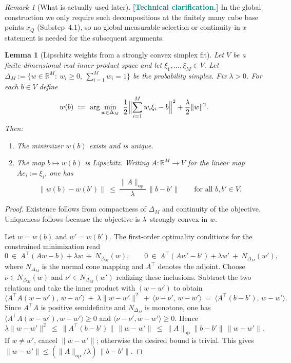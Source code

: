 \documentclass[11pt]{article}
\newcommand{\REVMZ}[1]{\textcolor{teal}{#1}}  %
\numberwithin{equation}{section}  %
\theoremstyle{plain}
\newtheorem{lemma}[theorem]{Lemma}
\theoremstyle{definition}
\theoremstyle{remark}
\newtheorem{remark}[theorem]{Remark}
\newcommand{\R}{\mathbb{R}}
\begin{document}
\begin{remark}[What is actually used later]\label{rem:caratheodory-quantitative}
\REVMZ{\textbf{[Technical clarification.]}}
In the global construction we only require such decompositions at the finitely many cube base points $x_Q$
(Substep~4.1), so no global measurable selection or continuity-in-$x$ statement is needed for the subsequent arguments.




\end{remark}

\begin{lemma}[Lipschitz weights from a strongly convex simplex fit]\label{lem:lipschitz-qp-weights}
Let $V$ be a finite-dimensional real inner-product space and let $\xi_1,\dots,\xi_M\in V$.
Let $\Delta_M:=\{w\in\R^M:\ w_i\ge 0,\ \sum_{i=1}^M w_i=1\}$ be the probability simplex.
Fix $\lambda>0$.
For each $b\in V$ define
\[
w(b)\ :=\ \arg\min_{w\in\Delta_M}\ \frac12\Bigl\|\sum_{i=1}^M w_i\xi_i-b\Bigr\|^2+\frac{\lambda}{2}\|w\|^2.
\]
Then:
\begin{enumerate}
\item[\textnormal{(i)}] The minimizer $w(b)$ exists and is unique.
\item[\textnormal{(ii)}] The map $b\mapsto w(b)$ is Lipschitz.  Writing $A:\R^M\to V$ for the linear map
$A e_i:=\xi_i$, one has
\[
\|w(b)-w(b')\|\ \le\ \frac{\|A\|_{\mathrm{op}}}{\lambda}\,\|b-b'\|\qquad\text{for all }b,b'\in V.
\]
\end{enumerate}
\end{lemma}

\begin{proof}
Existence follows from compactness of $\Delta_M$ and continuity of the objective.
Uniqueness follows because the objective is $\lambda$--strongly convex in $w$.

Let $w=w(b)$ and $w'=w(b')$.
The first-order optimality conditions for the constrained minimization read
\[
0\ \in\ A^\top(Aw-b)+\lambda w\ +\ N_{\Delta_M}(w),
\qquad
0\ \in\ A^\top(Aw'-b')+\lambda w'\ +\ N_{\Delta_M}(w'),
\]
where $N_{\Delta_M}$ is the normal cone mapping and $A^\top$ denotes the adjoint.
Choose $\nu\in N_{\Delta_M}(w)$ and $\nu'\in N_{\Delta_M}(w')$ realizing these inclusions.
Subtract the two relations and take the inner product with $(w-w')$ to obtain
\[
\langle A^\top A(w-w'),\,w-w'\rangle\ +\ \lambda\|w-w'\|^2\ +\ \langle \nu-\nu',\,w-w'\rangle
\ =\ \langle A^\top(b-b'),\,w-w'\rangle.
\]
Since $A^\top A$ is positive semidefinite and $N_{\Delta_M}$ is monotone, one has
$\langle A^\top A(w-w'),w-w'\rangle\ge 0$ and $\langle \nu-\nu',w-w'\rangle\ge 0$.
Hence
\[
\lambda\|w-w'\|^2\ \le\ \|A^\top(b-b')\|\,\|w-w'\|
\ \le\ \|A\|_{\mathrm{op}}\|b-b'\|\,\|w-w'\|.
\]
If $w\neq w'$, cancel $\|w-w'\|$; otherwise the desired bound is trivial.  This gives
$\|w-w'\|\le (\|A\|_{\mathrm{op}}/\lambda)\,\|b-b'\|$.
\end{proof}
\end{document}
